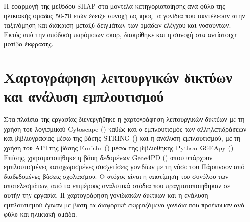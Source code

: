 \documentclass[12pt]{report}
\begin{document}
        \par
            Η εφαρμογή της μεθόδου SHAP στα μοντέλα κατηγοριοποίησης ανά φύλο της ηλικιακής ομάδας 50-70 ετών έδειξε συνοχή ως προς τα γονίδια που συντέλεσαν στην ταξινόμηση και διάκριση μεταξύ δειγμάτων των ομάδων ελέγχου και νοσούντων. Εκτός από την απόδοση παρόμοιων σκορ, διακρίθηκε και η συνοχή στα αντίστοιχα μοτίβα έκφρασης.

    \section{Χαρτογράφηση λειτουργικών δικτύων και ανάλυση εμπλουτισμού}
            Στα πλαίσια της εργασίας διενεργήθηκε η χαρτογράφηση λειτουργικών δικτύων με τη χρήση του λογισμικού Cytoscape (\emph{\cite{Shannon2003Cytoscape:Networks}}) καθώς και ο εμπλουτισμός των αλληλεπιδράσεων και βιβλιογραφίας μέσω της βάσης STRING (\emph{\cite{Szklarczyk2023TheInterest}})  και η ανάλυση εμπλουτισμού, με τη χρήση του API  της βάσης Enrichr (\emph{\cite{Chen2013Enrichr:Tool}}) μέσω της βιβλιοθήκης Python GSEApy (\emph{\cite{Fang2023GSEApy:Python}}). Επίσης, χρησιμοποιήθηκε η βάση δεδομένων Gene4PD (\emph{\cite{Li2021Gene4PD:Disease}}) όπου υπάρχουν εμπλουτισμένες καταχωρισμένες συσχετίσεις γονιδίων με τη νόσο του Πάρκινσον από διαδεδομένες βάσεις σχολιασμού. Ο στόχος είναι η αποτίμηση του συνόλου των αποτελεσμάτων, από τα επιμέρους αναλυτικά στάδια που πραγματοποιήθηκαν σε αυτήν την εργασία. Η χαρτογράφηση γονιδιακών δικτύων και η ανάλυση εμπλουτισμού έγιναν με βάση τα διαφορικά εκφραζόμενα γονίδια που προέκυψαν ανά φύλο και ηλικιακή ομάδα.
        \par
\end{document}
